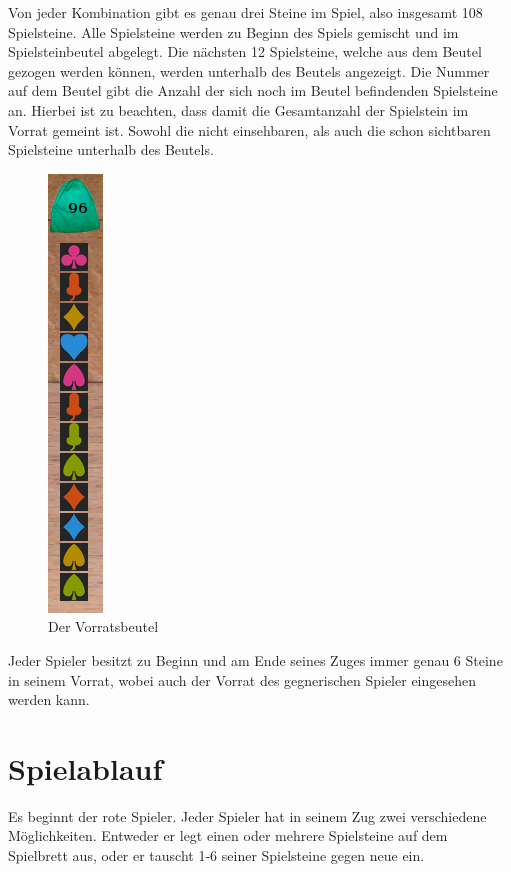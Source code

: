 \documentclass[a4paper, ngerman]{scrartcl}
\begin{document}
Von jeder Kombination gibt es genau drei Steine im Spiel, also insgesamt 108 Spielsteine. Alle Spielsteine werden zu Beginn des Spiels gemischt und im Spielsteinbeutel abgelegt. Die nächsten 12 Spielsteine, welche aus dem Beutel gezogen werden können, werden unterhalb des Beutels angezeigt. Die Nummer auf dem Beutel gibt die Anzahl der sich noch im Beutel befindenden Spielsteine an. Hierbei ist zu beachten, dass damit die Gesamtanzahl der Spielstein im Vorrat gemeint ist. Sowohl die nicht einsehbaren, als auch die schon sichtbaren Spielsteine unterhalb des Beutels.\\

\begin{figure}[h] \centering 
	\includegraphics[scale = 0.7]{images/Vorratsbeutel}
	\caption{Der Vorratsbeutel}
	\label{fig:Vorratsbeutel}
\end{figure}
Jeder Spieler besitzt zu Beginn und am Ende seines Zuges immer genau 6 Steine in seinem Vorrat, wobei auch der Vorrat des gegnerischen Spieler eingesehen werden kann.\\




	

\section{Spielablauf}		
	Es beginnt der rote Spieler. Jeder Spieler hat in seinem Zug zwei verschiedene Möglichkeiten. Entweder er legt einen oder mehrere Spielsteine auf dem Spielbrett aus, oder er tauscht 1-6 seiner Spielsteine gegen neue ein.	
	
\end{document}
